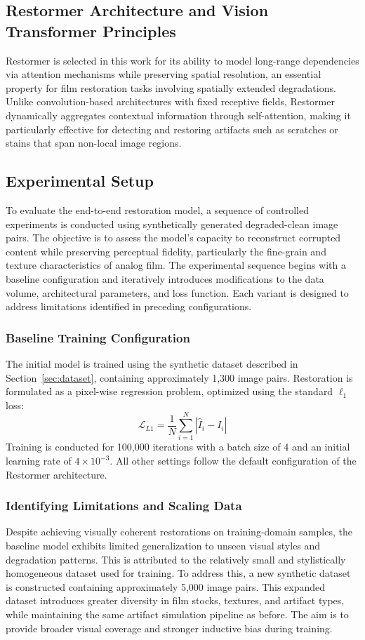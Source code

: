 \documentclass[10pt,a4paper,twocolumn,twoside]{article}
\begin{document}
\subsection{Restormer Architecture and Vision Transformer Principles}
Restormer \cite{restormer} is selected in this work for its ability to model long-range dependencies via attention mechanisms while preserving spatial resolution, an essential property for film restoration tasks involving spatially extended degradations. Unlike convolution-based architectures with fixed receptive fields, Restormer dynamically aggregates contextual information through self-attention, making it particularly effective for detecting and restoring artifacts such as scratches or stains that span non-local image regions.
\subsection{Experimental Setup}
To evaluate the end-to-end restoration model, a sequence of controlled experiments is conducted using synthetically generated degraded-clean image pairs. The objective is to assess the model's capacity to reconstruct corrupted content while preserving perceptual fidelity, particularly the fine-grain and texture characteristics of analog film. The experimental sequence begins with a baseline configuration and iteratively introduces modifications to the data volume, architectural parameters, and loss function. Each variant is designed to address limitations identified in preceding configurations.
\subsubsection{Baseline Training Configuration}
The initial model is trained using the synthetic dataset described in Section~\ref{sec:dataset}, containing approximately 1,300 image pairs. Restoration is formulated as a pixel-wise regression problem, optimized using the standard $\ell_1$ loss:
\begin{equation*}
\mathcal{L}_{L1} = \dfrac{1}{N} \sum_{i=1}^{N} \left| \hat{I}_i - I_i \right|
\end{equation*}
Training is conducted for 100{,}000 iterations with a batch size of 4 and an initial learning rate of $4 \times 10^{-3}$. All other settings follow the default configuration of the Restormer architecture.
\subsubsection{Identifying Limitations and Scaling Data}
Despite achieving visually coherent restorations on training-domain samples, the baseline model exhibits limited generalization to unseen visual styles and degradation patterns. This is attributed to the relatively small and stylistically homogeneous dataset used for training. To address this, a new synthetic dataset is constructed containing approximately 5,000 image pairs. This expanded dataset introduces greater diversity in film stocks, textures, and artifact types, while maintaining the same artifact simulation pipeline as before. The aim is to provide broader visual coverage and stronger inductive bias during training.
\end{document}

